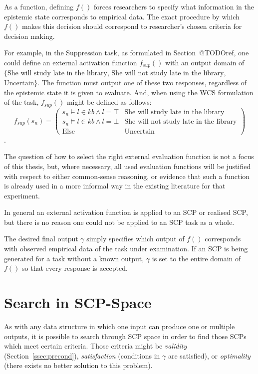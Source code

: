 As a function, defining $f()$ forces researchers to specify what information in the epistemic state corresponds to empirical data. The exact procedure by which $f()$ makes this decision should correspond to researcher's chosen criteria for decision making.

For example, in the Suppression task, as formulated in Section~@TODOref, one could define an external activation function $f_{sup}()$ with an output domain of $\{\textrm{She will study late in the library}$, $\textrm{She will not study late in the library}$, $\textrm{Uncertain}\}$. The function must output one of these two responses, regardless of the epistemic state it is given to evaluate. And, when using the WCS formulation of the task, $f_{sup}()$ might be defined as follows:
\[
f_{sup}(s_n) = \begin{pmatrix} s_n \models l\in kb \land l=\top& \textrm{She will study late in the library} \\  s_n \models l \in kb \land l=\bot  & \textrm{She will not study late in the library}   \\ \textrm{Else} & \textrm{Uncertain} \end{pmatrix}
\].

The question of how to select the right external evaluation function is not a focus of this thesis, but, where necessary, all used evaluation functions will be justified with respect to either common-sense reasoning, or evidence that such a function is already used in a more informal way in the existing literature for that experiment.

In general an external activation function is applied to an SCP or realised SCP, but there is no reason one could not be applied to an SCP task as a whole.

The desired final output $\gamma$ simply specifies which output of $f()$ corresponds with observed empirical data of the task under examination. If an SCP is being generated for a task without a known output, $\gamma$ is set to the entire domain of $f()$ so that every response is accepted.

\section{Search in SCP-Space}
As with any data structure in which one input can produce one or multiple outputs, it is possible to search through SCP space in order to find those SCPs which meet certain criteria. Those criteria might be \textit{validity} (Section~\ref{ssec:precond}), \textit{satisfaction} (conditions in $\gamma$ are satisfied), or \textit{optimality} (there exists no better solution to this problem).

